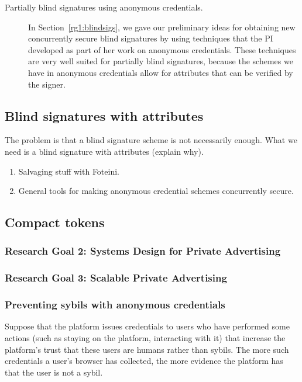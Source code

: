 \begin{description}
\item[Partially blind signatures using anonymous credentials.] In Section~\ref{rg1:blindsigs}, we gave our preliminary ideas for obtaining new concurrently secure blind signatures by using techniques that the PI developed as part of her work on anonymous credentials.  These techniques are very well suited for partially blind signatures, because the schemes we have in anonymous credentials allow for attributes that can be verified by the signer.
\end{description}

\subsection{Blind signatures with attributes}
\label{rg1:attributes}

The problem is that a blind signature scheme is not necessarily enough.  What we need is a blind signature with attributes (explain why). 

\begin{enumerate}
\item Salvaging stuff with Foteini.
\item General tools for making anonymous credential schemes concurrently secure.  
\end{enumerate}

\subsection{Compact tokens}
\label{rg1:compact}


\subsubsection{Research Goal 2: Systems Design for Private Advertising}

\subsubsection{Research Goal 3: Scalable Private Advertising}

\subsubsection{Preventing sybils with anonymous credentials} 
%
Suppose that the platform issues credentials to users who have performed some actions (such as staying on the platform, interacting with it) that increase the platform's trust that these users are humans rather than sybils.  
%
The more such credentials a user's browser has collected, the more evidence the platform has that the user is not a sybil.  

